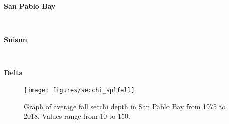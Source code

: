 \documentclass[
]{book}
\begin{document}
\begin{panel-grid}

\begin{columns-nocenter}

\begin{column800}

\textbf{San Pablo Bay}

\end{column800}

\begin{column40}

~

\end{column40}

\begin{column800}

\textbf{Suisun}

\end{column800}

\begin{column40}

~

\end{column40}

\begin{column800}

\textbf{Delta}

\end{column800}

\end{columns-nocenter}

\begin{columns-nocenter}

\begin{column800}

\begin{expand}

\begin{figure}
\texttt{[image: figures/secchi\_splfall]} \caption{Graph of average fall secchi depth in San Pablo Bay from 1975 to 2018. Values range from 10 to 150.}\label{fig:unnamed-chunk-96}
\end{figure}

\end{expand}

\end{column800}

\begin{column40}

~

\end{column40}


\end{columns-nocenter}
\end{panel-grid}
\end{document}
